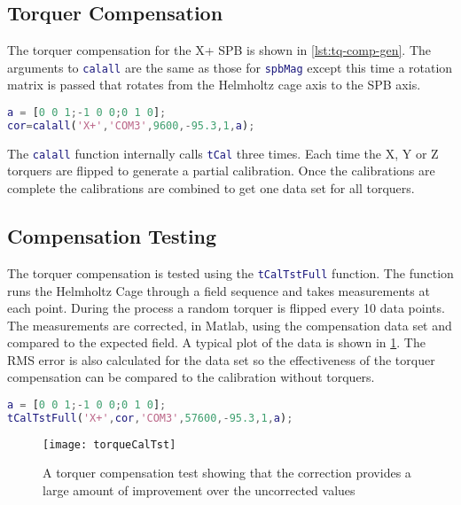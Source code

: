\subsection{Torquer Compensation}

The torquer compensation for the X+ \ac{SPB} is shown in \cref{lst:tq-comp-gen}. The arguments to \lstinline[style=code,language=Matlab]$calall$ are the same as those for \lstinline[style=code,language=Matlab]$spbMag$ except this time a rotation matrix is passed that rotates from the Helmholtz cage axis to the \ac{SPB} axis.

\begin{lstlisting}[style=code,caption={Torquer compensation for the X+ \ac{SPB}},label={lst:tq-comp-gen},language=Matlab]
a = [0 0 1;-1 0 0;0 1 0];
cor=calall('X+','COM3',9600,-95.3,1,a);
\end{lstlisting}

The \lstinline[style=code,language=Matlab]$calall$ function internally calls \lstinline[style=code,language=Matlab]$tCal$ three times. Each time the X, Y or Z torquers are flipped to generate a partial calibration. Once the calibrations are complete the calibrations are combined to get one data set for all torquers.

\subsection{Compensation Testing}

The torquer compensation is tested using the \lstinline[style=code,language=Matlab]$tCalTstFull$ function. The function runs the Helmholtz Cage through a field sequence and takes measurements at each point. During the process a random torquer is flipped every 10 data points. The measurements are corrected, in Matlab, using the compensation data set and compared to the expected field. A typical plot of the data is shown in \cref{fig:tqtst}. The RMS error is also calculated for the data set so the effectiveness of the torquer compensation can be compared to the calibration without torquers.

\begin{lstlisting}[style=code,caption={Running torquer compensation test for the X+ \ac{SPB}},label={lst:tCalTst},language=Matlab]
a = [0 0 1;-1 0 0;0 1 0];
tCalTstFull('X+',cor,'COM3',57600,-95.3,1,a);
\end{lstlisting}

\begin{figure}[!ht]
    \centering
    \texttt{[image: torqueCalTst]}
  \caption{A torquer compensation test showing that the correction provides a large amount of improvement over the uncorrected values}
    \label{fig:tqtst}
\end{figure}

